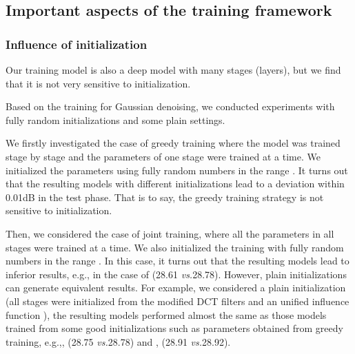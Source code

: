 \documentclass[10pt,journal,compsoc]{IEEEtran}
\newcommand{\eg}{\emph{e.g.}}
\newcommand{\ie}{\emph{i.e.}}
\newcommand{\vs}{\emph{vs.}}
\begin{document}
\begin{comment}
Moreover, in the diffusion model \eqref{diffusion}, if we replace the learned influence functions  with a 
usual influence function, \eg,  used in the PM model, the final state of this diffusion process 
is a constant image of the average gray value of the input image. 
Usually, people think that the PM model with the influence function of the form 
 (the corresponding penalty function given as ), 
owns the property of edge preserving. 
However, it can not really preserve image edges during diffusion, because the involved penalty function 
always penalize edge response, unless it is zero, \ie, a flat image. 
It turns out that this type of influence functions 
can only slow down the diffusion (image smoothing) across image edges, but they can not stop the diffusion. 
However, those unconventional influence functions in our learned models can not only stop the diffusion across image edges, but 
also enhance/sharpen image structures. 
\end{comment}

\subsection{Important aspects of the training framework}\label{important}
\subsubsection{Influence of initialization}
Our training model is also a deep model with many stages (layers), but we find that it 
is not very sensitive to initialization. 
{Based on the training for Gaussian denoising, 
we conducted experiments with fully random initializations and some plain settings. 

We firstly investigated the case of greedy training where the model was trained 
stage by stage and the parameters of one stage 
were trained at a time. We initialized the parameters using fully random numbers 
in the range . It turns out that the resulting models with different 
initializations lead to a deviation within 0.01dB in the test phase. That is to say, 
the greedy training strategy is not sensitive to initialization. 

Then, we considered the case of joint training, where all the parameters 
in all stages were trained at a time. 
We also initialized the training with 
fully random numbers in the range . 
In this case, it turns out that the resulting 
models lead to inferior results, 
e.g., in the case of  (28.61 \vs 28.78). 
However, plain initializations can generate equivalent results. For example, 
we considered a plain initialization (all stages were initialized from the modified 
DCT filters and an unified influence function ), the 
resulting models performed almost the same as those models trained from some 
good initializations such as parameters obtained from greedy training, 
e.g.,, (28.75 \vs 28.78) and 
, (28.91 \vs 28.92).} 
\end{document}
